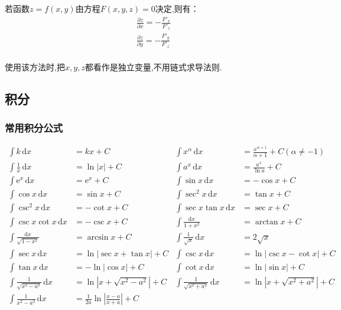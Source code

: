 若函数$z=f(x,y)$由方程$F(x,y,z)=0$决定,则有：
\begin{gather*}
    \frac{\partial z}{\partial x} =-\frac{F'_x}{F'_z}\\
    \frac{\partial z}{\partial y} =-\frac{F'_y}{F'_z}\\
\end{gather*}

使用该方法时,把$x,y,z$都看作是独立变量,不用链式求导法则.

\subsection{积分}
\subsubsection{常用积分公式}
\begin{align*}
    \int k \,\mathrm{d}x &=kx+C&
    \int x^\alpha\,\mathrm{d}x &=\frac{x^{\alpha+1}}{\alpha+1}+C (\alpha\neq -1)\\
    \int\frac{1}{x}\,\mathrm{d}x &=\ln\left\lvert x\right\rvert +C&
    \int a^x\,\mathrm{d}x &=\frac{a^x}{\ln a}+C\\
    \int \mathrm{e}^x\,\mathrm{d}x &=\mathrm{e}^x+C&
    \int\sin x\,\mathrm{d}x &=-\cos x+C\\
    \int\cos x\,\mathrm{d}x &=\sin x +C&
    \int\sec^2 x\,\mathrm{d}x &=\tan x +C\\
    \int\csc^2 x\,\mathrm{d}x &=-\cot x +C&
    \int\sec x\tan x\,\mathrm{d}x &=\sec x+C\\
    \int\csc x\cot x\,\mathrm{d}x &=-\csc x+C&
    \int\frac{\mathrm{d}x}{1+x^2} &=\arctan x+C\\
    \int\frac{\mathrm{d}x}{\sqrt{1-x^2}} &=\arcsin x+C &
    \int\frac{1}{\sqrt{x}} \,\mathrm{d}x &=2\sqrt{x}\\
    \int\sec x\,\mathrm{d}x &=\ln \left\lvert \sec x+\tan x\right\rvert +C&
    \int\csc x\,\mathrm{d}x &=\ln \left\lvert \csc x-\cot x\right\rvert +C\\
    \int\tan x\,\mathrm{d}x &=-\ln \left\lvert \cos x\right\rvert +C&
    \int\cot x\,\mathrm{d}x &=\ln \left\lvert \sin x\right\rvert +C\\
    \int\frac{1}{\sqrt{x^2-a^2}}\,\mathrm{d}x &=\ln \left\lvert x+\sqrt{x^2-a^2}\right\rvert +C&
    \int\frac{1}{\sqrt{x^2+a^2}} \,\mathrm{d}x &=\ln \left\lvert x+\sqrt{x^2+a^2}\right\rvert +C\\
    \int \frac{1}{x^2-a^2} \,\mathrm{d}x &=\frac{1}{2a}\ln \left\lvert \frac{x-a}{x+a}\right\rvert +C
\end{align*}

